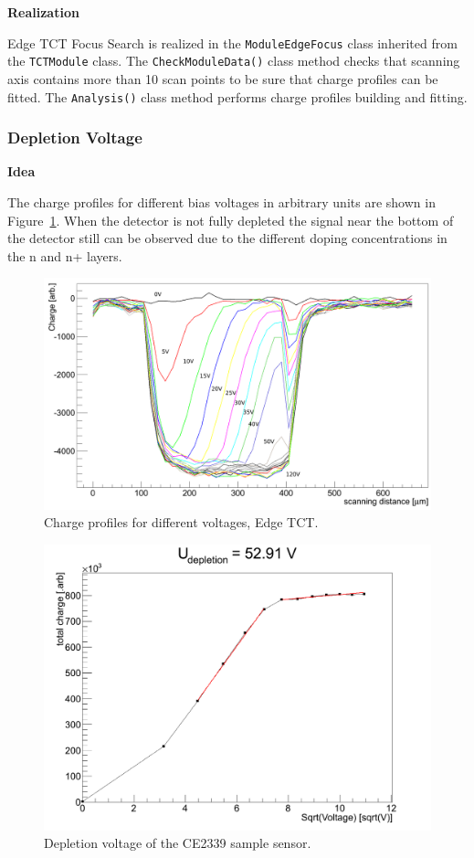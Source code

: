 \documentclass[12pt,oneside,notitlepage,abstracton,a4paper]{scrartcl}
\begin{document}
\textbf{Realization}

\indent Edge TCT Focus Search is realized in the \lstinline$ModuleEdgeFocus$ class inherited from the \lstinline$TCTModule$ class. The \lstinline$CheckModuleData()$ class method checks that scanning axis contains more than 10 scan points to be sure that charge profiles can be fitted. The \lstinline$Analysis()$ class method performs charge profiles building and fitting.

\subsubsection{Depletion Voltage}\label{modules:edge:depl}

\textbf{Idea}

The charge profiles for different bias voltages in arbitrary units are shown in Figure~\ref{fig:edge_charge_profiles}. When the detector is not fully depleted the signal near the bottom of the detector still can be observed due to the different doping concentrations in the n and n+ layers.
\begin{figure}[H]
    \centering
    \includegraphics[width=12cm]{pics/edge_charge_profiles}
    \caption{Charge profiles for different voltages, Edge TCT.}
    \label{fig:edge_charge_profiles}
\end{figure}

\begin{figure}[H]
    \centering
    \includegraphics[width=12cm]{pics/edge_depletion}
    \caption{Depletion voltage of the CE2339 sample sensor.}
    \label{fig:edge_depletion}
\end{figure}
\end{document}
